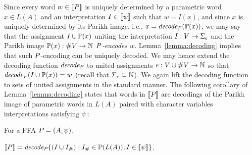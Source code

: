 \documentclass[sigplan,review,anonymous]{acmart}\settopmatter{printfolios=true,printccs=false,printacmref=false}
\begin{document}
Since every word $w \in [\![P]\!]$ is uniquely determined by a parametric word $x\in L(A)$ and an interpretation $I\in[\![\psi]\!]$ such that $w = I(x)$, and since $x$ is uniquely determined by its Parikh image, i.e.,  
$x = \mathit{decode_{P}}(\mathbb{P}{(x)})$, 
we may say that the assignment $I \cup \mathbb{P}{(x)}$ uniting the interpretation $I:V\rightarrow\Sigma_\epsilon$ and the Parikh image $\mathbb{P}{(x)}:\#V\rightarrow \mathbb{N}$ \emph{$P$-encodes} $w$. Lemma~\ref{lemma:decoding} implies that such $P$-encoding can be uniquely decoded. 
We may hence extend the decoding function $\mathit{decode_{P}}$ to united assignments $e:V\cup\#V \rightarrow \mathbb{N}$ 
so that $\mathit{decode_{P}}(I \cup \mathbb{P}{(x)}) = w$ (recall that $\Sigma_\epsilon \subseteq \mathbb{N}$). 
We again lift the decoding function to sets of united assignments in the standard manner.
The following corollary of Lemma~\ref{lemma:decoding} states that words in $[\![P]\!]$ are decodings of the Parikh image of parametric words in $L(A)$ paired with character variables interpretations satisfying $\psi$:

\begin{corollary}\label{corollary:pfa}
For a PFA $P = (A,\psi)$,
\\
\centerline{$[\![P]\!] = \mathit{decode_{P}} \{(I\cup I_{\#})\mid I_{\#}\in\mathbb{P}{(L(A))} ,I\in[\![\psi]\!]\}$.}
\end{corollary}
%

\end{document}
